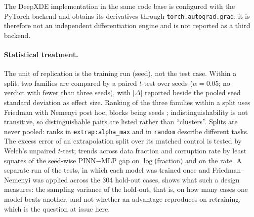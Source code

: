 The DeepXDE implementation in the same code base \cite{TODO-deepxde} is
configured with the PyTorch backend and obtains its derivatives through
\texttt{torch.autograd.grad}; it is therefore not an independent
differentiation engine and is not reported as a third backend.

\paragraph{Statistical treatment.}
The unit of replication is the training run (seed), not the test case. Within a
split, two families are compared by a paired $t$-test over seeds ($\alpha=0.05$;
no verdict with fewer than three seeds), with $|\Delta|$ reported beside the pooled
seed standard deviation as effect size.
Ranking of the three families within a split uses Friedman with Nemenyi post hoc,
blocks being seeds \cite{TODO-demsar-2006}; indistinguishability is not
transitive, so distinguishable pairs are listed rather than ``clusters''.
Splits are never pooled: ranks in \texttt{extrap:alpha\_max} and in
\texttt{random} describe different tasks.
The excess error of an extrapolation split over its matched control is tested by
Welch's unpaired $t$-test; trends across data fraction and corruption rate by
least squares of the seed-wise PINN$-$MLP gap on $\log$(fraction) and on the rate.
A separate run of the tests, in which each model was trained once and
Friedman--Nemenyi was applied across the 304 hold-out cases, shows what such a
design measures: the sampling variance of the hold-out, that is, on how many
cases one model beats another, and not whether an advantage reproduces on
retraining, which is the question at issue here.

